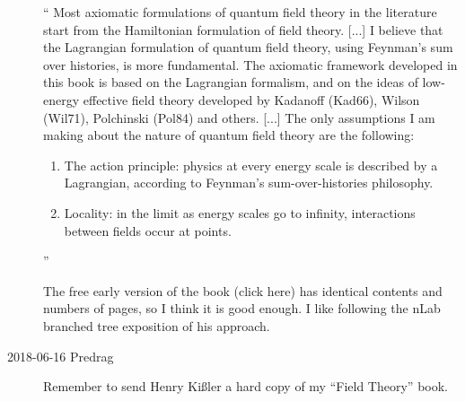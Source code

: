 \begin{description}
``
Most axiomatic formulations of quantum field theory in the literature
start from the Hamiltonian formulation of field theory. [...]
I believe that the Lagrangian formulation of quantum field theory, using
Feynman’s sum over histories, is more fundamental. The axiomatic framework
developed in this book is based on the Lagrangian formalism, and on
the ideas of low-energy effective field theory developed by Kadanoff (Kad66),
Wilson (Wil71), Polchinski (Pol84) and others.
[...]
The only assumptions
I am making about the nature of quantum field theory are the
following:
\begin{enumerate}
  \item
The action principle: physics at every energy scale is described by a
Lagrangian, according to Feynman’s sum-over-histories philosophy.
  \item
Locality: in the limit as energy scales go to infinity, interactions
between fields occur at points.
\end{enumerate}
''

The free early version of the book (click
{here}) has identical contents and numbers of pages, so I think it is
good enough.
I like following the
{nLab} branched tree exposition of his approach.


\item[2018-06-16 Predrag]
Remember to send Henry Ki{\ss}ler a hard copy of my ``Field Theory''
book.


\end{description}


\printbibliography[heading=subbibintoc,title={References}]
